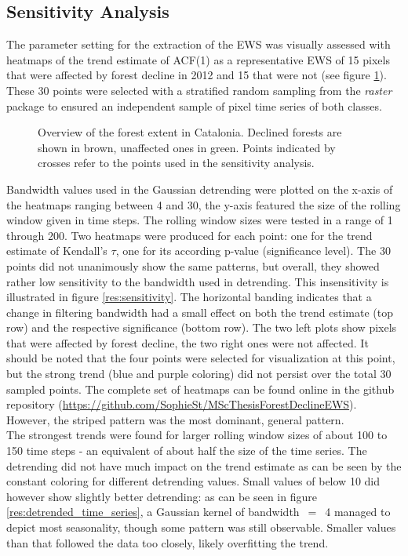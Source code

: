 \subsection{Sensitivity Analysis}\label{res_sensit}
The parameter setting for the extraction of the EWS was visually assessed with heatmaps of the trend estimate of ACF(1) as a representative EWS of 15 pixels that were affected by forest decline in 2012 and 15 that were not (see figure \ref{res:sensit_points}). These 30 points were selected with a stratified random sampling from the \textit{raster} package to ensured an independent sample of pixel time series of both classes.\\

\begin{figure}[ht]
	\centering
	\caption{Overview of the forest extent in Catalonia. Declined forests are shown in brown, unaffected ones in green. Points indicated by crosses refer to the points used in the sensitivity analysis.}\label{res:sensit_points}
\end{figure}

Bandwidth values used in the Gaussian detrending were plotted on the x-axis of the heatmaps ranging between 4 and 30, the y-axis featured the size of the rolling window given in time steps. The rolling window sizes were tested in a range of 1 through 200. Two heatmaps were produced for each point: one for the trend estimate of Kendall's $\tau$, one for its according p-value (significance level). The 30 points did not unanimously show the same patterns, but overall, they showed rather low sensitivity to the bandwidth used in detrending. This insensitivity is illustrated in figure \ref{res:sensitivity}. The horizontal banding indicates that a change in filtering bandwidth had a small effect on both the trend estimate (top row) and the respective significance (bottom row). The two left plots show pixels that were affected by forest decline, the two right ones were not affected. It should be noted that the four points were selected for visualization at this point, but the strong trend (blue and purple coloring) did not persist over the total 30 sampled points. The complete set of heatmaps can be found online in the github repository (\url{https://github.com/SophieSt/MScThesisForestDeclineEWS}). However, the striped pattern was the most dominant, general pattern.\\
The strongest trends were found for larger rolling window sizes of about 100 to 150 time steps - an equivalent of about half the size of the time series. The detrending did not have much impact on the trend estimate as can be seen by the constant coloring for different detrending values. Small values of below 10 did however show slightly better detrending: as can be seen in figure \ref{res:detrended_time_series}, a Gaussian kernel of bandwidth~$=$~4 managed to depict most seasonality, though some pattern was still observable. Smaller values than that followed the data too closely, likely overfitting the trend.\\

